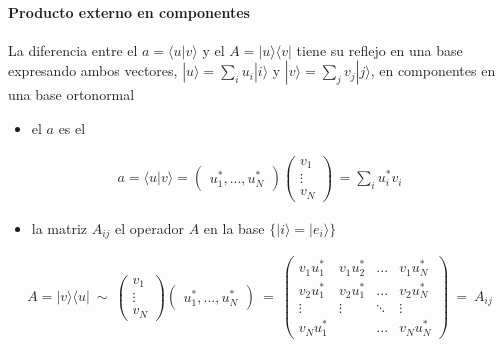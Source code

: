 \documentclass[letterpaper,10pt,english]{jupyterBook}
\newcommand{\ket}[1]{|#1\rangle}
\newcommand{\braket}[2]{\langle #1|#2\rangle}
\newcommand{\ketbra}[2]{| #1\rangle \langle #2 |}
\begin{document}
\paragraph{Producto externo en componentes}
\label{\detokenize{docs/Part_01_Formalismo/Chapter_01_02_Formalismo_matem_xe1tico/01_03_Operadores_myst:producto-externo-en-componentes}}
\sphinxAtStartPar
La diferencia entre el  \(a=\braket{u}{v}\) y el  \(A=\ketbra{u}{v}\) tiene su reflejo en una base expresando ambos vectores, \(\ket{u} = \sum_i u_i\ket{i}\) y \(\ket{v} = \sum_j v_j \ket{j}\),  en componentes en una base ortonormal
\begin{itemize}
\item {} 
\sphinxAtStartPar
el  \(a\)  es el 

\end{itemize}
\begin{equation*}
\begin{split}
 a = \braket{u}{v}  = \begin{pmatrix} u_1^*,...,u_N^*\end{pmatrix}
\begin{pmatrix} v_1 \\ \vdots \\ v_N\end{pmatrix}\, =  \sum_i u_i^*v_i
\end{split}
\end{equation*}\begin{itemize}
\item {} 
\sphinxAtStartPar
la matriz \(A_{ij}\)     el operador \(A\) en la base \(\{\ket{i}=\ket{e_i}\}\)

\end{itemize}
\begin{equation*}
\begin{split}
A = \ketbra{v}{u} ~\sim ~\begin{pmatrix} v_1 \\ \vdots \\ v_N\end{pmatrix}
\begin{pmatrix} u_1^*,...,u_N^*\end{pmatrix} ~=~ 
\begin{pmatrix} v_1 u_1^* & v_1u_2^* & ... & v_1 u_N^* \\
v_2 u_1^* & v_2 u_1^*& ... & v_2 u_N^* \\ \vdots & \vdots  & \ddots & \vdots \\
v_N u_1^* & & ... & v_N u_N^* \end{pmatrix} ~ = ~A_{ij}
\end{split}
\end{equation*}
\end{document}
